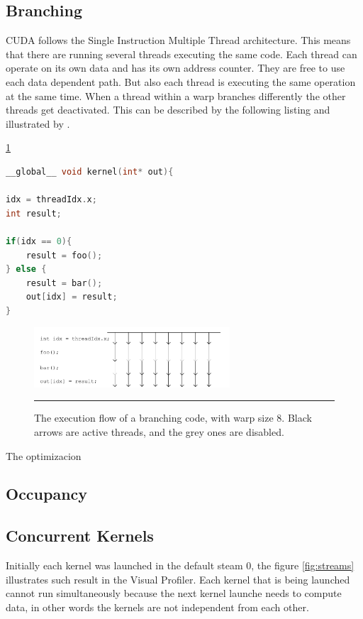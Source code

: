  
 \subsection{Branching}
 
 CUDA follows the Single Instruction Multiple Thread architecture. This means that there are running several threads executing the same code. Each thread can operate on its own data and has its own address counter. They are free to use each data dependent path. But also each thread is executing the same operation at the same time. When a thread within a warp branches differently the other threads get deactivated. This can be described by the following listing and illustrated by \cite{hoermanngpu}.
 
 \ref{fig:threads}
 
\begin{lstlisting}[language=C++, caption={CPU Vector Addition}]
__global__ void kernel(int* out){
 
idx = threadIdx.x;
int result;

if(idx == 0){
	result = foo();
} else {
	result = bar();
	out[idx] = result;
}
\end{lstlisting}

\begin{figure}[htbp]
	\centering
		\includegraphics[width=0.65\textwidth]{Figures/threads.png}
		\rule{35em}{0.2pt}
	\caption[he execution flow]{The execution flow of a branching code, with warp size 8. Black arrows are active threads, and the grey ones are disabled.
}
	\label{fig:threads}
\end{figure}

The optimizacion

\subsection{Occupancy}
 

\subsection{Concurrent Kernels}

Initially each kernel was launched in the default steam 0, the figure \ref{fig:streams} illustrates such result in the Visual Profiler. Each kernel that is being launched cannot run simultaneously because the next kernel launche needs to compute data, in other words the kernels are not independent from each other.


